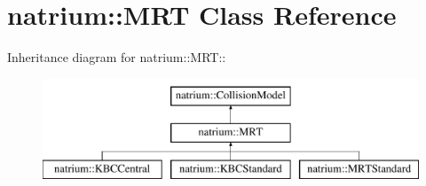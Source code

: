 \hypertarget{classnatrium_1_1MRT}{
\section{natrium::MRT Class Reference}
\label{classnatrium_1_1MRT}
}
Inheritance diagram for natrium::MRT::\begin{figure}[H]
\begin{center}
\leavevmode
\includegraphics[height=3cm]{classnatrium_1_1MRT}
\end{center}
\end{figure}

